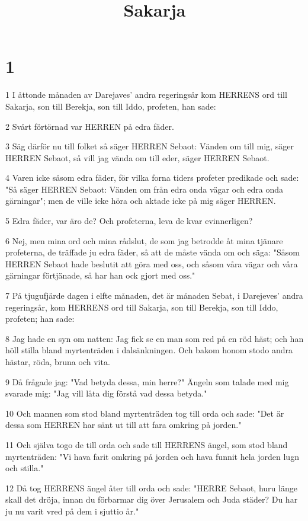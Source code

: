 

\title{Sakarja}


\chapter{1}

\par 1 I åttonde månaden av Darejaves' andra regeringsår kom HERRENS ord till Sakarja, son till Berekja, son till Iddo, profeten, han sade:
\par 2 Svårt förtörnad var HERREN på edra fäder.
\par 3 Säg därför nu till folket så säger HERREN Sebaot: Vänden om till mig, säger HERREN Sebaot, så vill jag vända om till eder, säger HERREN Sebaot.
\par 4 Varen icke såsom edra fäder, för vilka forna tiders profeter predikade och sade: "Så säger HERREN Sebaot: Vänden om från edra onda vägar och edra onda gärningar"; men de ville icke höra och aktade icke på mig säger HERREN.
\par 5 Edra fäder, var äro de? Och profeterna, leva de kvar evinnerligen?
\par 6 Nej, men mina ord och mina rådslut, de som jag betrodde åt mina tjänare profeterna, de träffade ju edra fäder, så att de måste vända om och säga: "Såsom HERREN Sebaot hade beslutit att göra med oss, och såsom våra vägar och våra gärningar förtjänade, så har han ock gjort med oss."
\par 7 På tjugufjärde dagen i elfte månaden, det är månaden Sebat, i Darejeves' andra regeringsår, kom HERRENS ord till Sakarja, son till Berekja, son till Iddo, profeten; han sade:
\par 8 Jag hade en syn om natten: Jag fick se en man som red på en röd häst; och han höll stilla bland myrtenträden i dalsänkningen. Och bakom honom stodo andra hästar, röda, bruna och vita.
\par 9 Då frågade jag: "Vad betyda dessa, min herre?" Ängeln som talade med mig svarade mig: "Jag vill låta dig förstå vad dessa betyda."
\par 10 Och mannen som stod bland myrtenträden tog till orda och sade: "Det är dessa som HERREN har sänt ut till att fara omkring på jorden."
\par 11 Och själva togo de till orda och sade till HERRENS ängel, som stod bland myrtenträden: "Vi hava farit omkring på jorden och hava funnit hela jorden lugn och stilla."
\par 12 Då tog HERRENS ängel åter till orda och sade: "HERRE Sebaot, huru länge skall det dröja, innan du förbarmar dig över Jerusalem och Juda städer? Du har ju nu varit vred på dem i sjuttio år."
